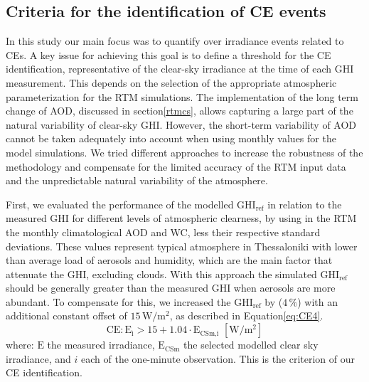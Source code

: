 \documentclass[preprint, 5p,
authoryear]{elsarticle} %
\begin{document}
\hypertarget{criteria-for-the-identification-of-ce-events}{%
\subsection{Criteria for the identification of CE
events}\label{criteria-for-the-identification-of-ce-events}}

In this study our main focus was to quantify over irradiance events
related to CEs. A key issue for achieving this goal is to define a
threshold for the CE identification, representative of the clear-sky
irradiance at the time of each GHI measurement. This depends on the
selection of the appropriate atmospheric parameterization for the RTM
simulations. The implementation of the long term change of AOD,
discussed in section\nobreakspace{}\ref{rtmcs}, allows capturing a large
part of the natural variability of clear-sky GHI. However, the
short-term variability of AOD cannot be taken adequately into account
when using monthly values for the model simulations. We tried different
approaches to increase the robustness of the methodology and compensate
for the limited accuracy of the RTM input data and the unpredictable
natural variability of the atmosphere.

First, we evaluated the performance of the modelled
\(\text{GHI}_\text{ref}\) in relation to the measured GHI for different
levels of atmospheric clearness, by using in the RTM the monthly
climatological AOD and WC, less their respective standard deviations.
These values represent typical atmosphere in Thessaloniki with lower
than average load of aerosols and humidity, which are the main factor
that attenuate the GHI, excluding clouds. With this approach the
simulated \(\text{GHI}_\text{ref}\) should be generally greater than the
measured GHI when aerosols are more abundant. To compensate for this, we
increased the \(\text{GHI}_\text{ref}\) by (\(4\,\%\)) with an
additional constant offset of \(15\,\text{W}/\text{m}^2\), as described
in Equation\nobreakspace\ref{eq:CE4}. \begin{equation}
\text{CE} : \text{E}_\text{i} > 15 + 1.04 \cdot \text{E}_\text{CSm,i} \,\,[\text{W}/\text{m}^2] \label{eq:CE4}
\end{equation} where: \(\text{E}\) the measured irradiance,
\(\text{E}_\text{CSm}\) the selected modelled clear sky irradiance, and
\(i\) each of the one-minute observation. This is the criterion of our
CE identification.
\end{document}
